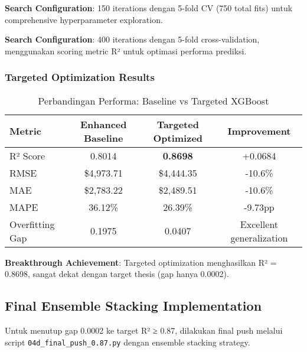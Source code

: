 \textbf{Search Configuration}: 150 iterations dengan 5-fold CV (750 total fits) untuk comprehensive hyperparameter exploration.

\textbf{Search Configuration}: 400 iterations dengan 5-fold cross-validation, menggunakan scoring metric R² untuk optimasi performa prediksi.

\subsubsection{Targeted Optimization Results}

\begin{table}[H]
\centering
\caption{Perbandingan Performa: Baseline vs Targeted XGBoost}
\label{tab:targeted-performance}
\begin{tabular}{|l|c|c|c|}
\hline
\textbf{Metric} & \textbf{Enhanced Baseline} & \textbf{Targeted Optimized} & \textbf{Improvement} \\
\hline
R² Score & 0.8014 & \textbf{0.8698} & +0.0684 \\
RMSE & \$4,973.71 & \$4,444.35 & -10.6\% \\
MAE & \$2,783.22 & \$2,489.51 & -10.6\% \\
MAPE & 36.12\% & 26.39\% & -9.73pp \\
Overfitting Gap & 0.1975 & 0.0407 & Excellent generalization \\
\hline
\end{tabular}
\end{table}

\textbf{Breakthrough Achievement}: Targeted optimization menghasilkan R² = 0.8698, sangat dekat dengan target thesis (gap hanya 0.0002).

\subsection{Final Ensemble Stacking Implementation}
\label{subsec:ensemble-stacking}

Untuk menutup gap 0.0002 ke target R² ≥ 0.87, dilakukan final push melalui script \texttt{04d\_final\_push\_0.87.py} dengan ensemble stacking strategy.

